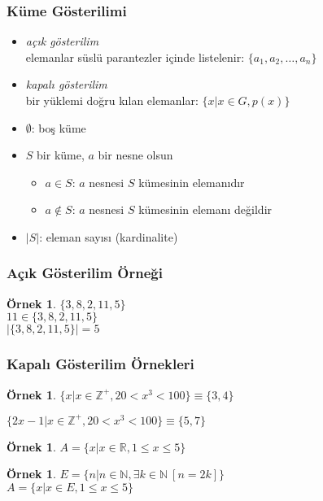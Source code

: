\documentclass[dvipsnames]{beamer}
\theoremstyle{definition}
\theoremstyle{example}
\newtheorem{ornek}[theorem]{Örnek}
\theoremstyle{plain}
\begin{document}
\begin{frame}
  \frametitle{Küme Gösterilimi}

  \begin{itemize}
    \item \emph{açık gösterilim}\\
      elemanlar süslü parantezler içinde listelenir: $\{a_1,a_2,\dots,a_n\}$

    \pause
    \medskip
    \item \emph{kapalı gösterilim}\\
      bir yüklemi doğru kılan elemanlar: $\{x | x \in G, p(x)\}$

    \pause
    \medskip
    \item $\emptyset$: boş küme

    \pause
    \medskip
    \item $S$ bir küme, $a$ bir nesne olsun
    \begin{itemize}
      \item $a \in S$: $a$ nesnesi $S$ kümesinin elemanıdır
      \item $a \notin S$: $a$ nesnesi $S$ kümesinin elemanı değildir
    \end{itemize}

    \pause
    \medskip
    \item $|S|$: eleman sayısı (\alert{kardinalite})
  \end{itemize}
\end{frame}

\begin{frame}
  \frametitle{Açık Gösterilim Örneği}

  \begin{ornek}
    $\{3,8,2,11,5\}$\\
    $11 \in \{3,8,2,11,5\}$\\
    $|\{3,8,2,11,5\}|=5$
  \end{ornek}
\end{frame}

\begin{frame}
  \frametitle{Kapalı Gösterilim Örnekleri}

  \begin{ornek}
    $\{x | x \in \mathbb{Z}^+, 20 < x^3 < 100\} \equiv \{3,4\}$

    $\{2x-1 | x \in \mathbb{Z}^+, 20 < x^3 < 100\} \equiv \{5,7\}$
  \end{ornek}

  \pause
  \begin{ornek}
    $A = \{x | x \in \mathbb{R}, 1 \leq x \leq 5\}$
  \end{ornek}

  \pause
  \begin{ornek}
    $E = \{n | n \in \mathbb{N}, \exists k \in \mathbb{N}~[n=2k]\}$\\
    $A = \{x | x \in E, 1 \leq x \leq 5\}$
  \end{ornek}
\end{frame}
\end{document}
